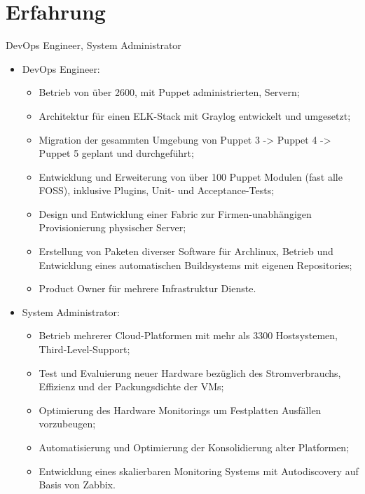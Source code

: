 \newpage

\section{Erfahrung}

%
  {DevOps Engineer, System Administrator
\begin{itemize}
  \item DevOps Engineer:
    \begin{itemize}
      \item Betrieb von über 2600, mit Puppet administrierten, Servern;
      \item Architektur für einen ELK-Stack mit Graylog entwickelt und umgesetzt;
      \item Migration der gesammten Umgebung von Puppet 3 -> Puppet 4 -> Puppet 5  geplant und durchgeführt;
      \item Entwicklung und Erweiterung von über 100 Puppet Modulen (fast alle FOSS), inklusive Plugins, Unit- und Acceptance-Tests;
      \item Design und Entwicklung einer Fabric zur Firmen-unabhängigen Provisionierung physischer Server;
      \item Erstellung von Paketen diverser Software für Archlinux, Betrieb und Entwicklung eines automatischen Buildsystems mit eigenen Repositories;
      \item Product Owner für mehrere Infrastruktur Dienste.
    \end{itemize}
  \item System Administrator:
    \begin{itemize}
      \item Betrieb mehrerer Cloud-Platformen mit mehr als 3300 Hostsystemen, Third-Level-Support;
      \item Test und Evaluierung neuer Hardware bezüglich des Stromverbrauchs, Effizienz und der Packungsdichte der VMs;
      \item Optimierung des Hardware Monitorings um Festplatten Ausfällen vorzubeugen;
      \item Automatisierung und Optimierung der Konsolidierung alter Platformen;
      \item Entwicklung eines skalierbaren Monitoring Systems mit Autodiscovery auf Basis von Zabbix.
    \end{itemize}
\end{itemize}}

